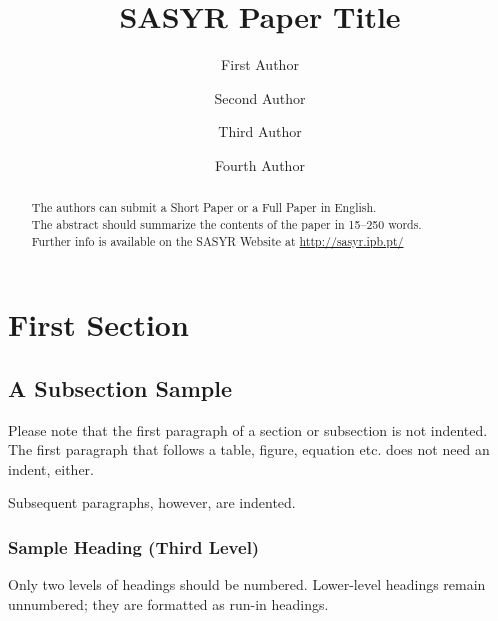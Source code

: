 \documentclass[runningheads]{llncs}
\begin{document}
%
\title{SASYR Paper Title}
%
%
\author{First Author \and
Second Author \and
Third Author\and
Fourth Author}
%
%
%
\maketitle              %
%
\begin{abstract}
The authors can submit a Short Paper or a Full Paper in English.\\
The abstract should summarize the contents of the paper in
15--250 words.\\
Further info is available on the SASYR Website at \url{http://sasyr.ipb.pt/}


\end{abstract}
%
%
%
\section{First Section}
\subsection{A Subsection Sample}
Please note that the first paragraph of a section or subsection is
not indented. The first paragraph that follows a table, figure,
equation etc. does not need an indent, either.

Subsequent paragraphs, however, are indented.

\subsubsection{Sample Heading (Third Level)} Only two levels of
headings should be numbered. Lower-level headings remain unnumbered;
they are formatted as run-in headings.
\end{document}
